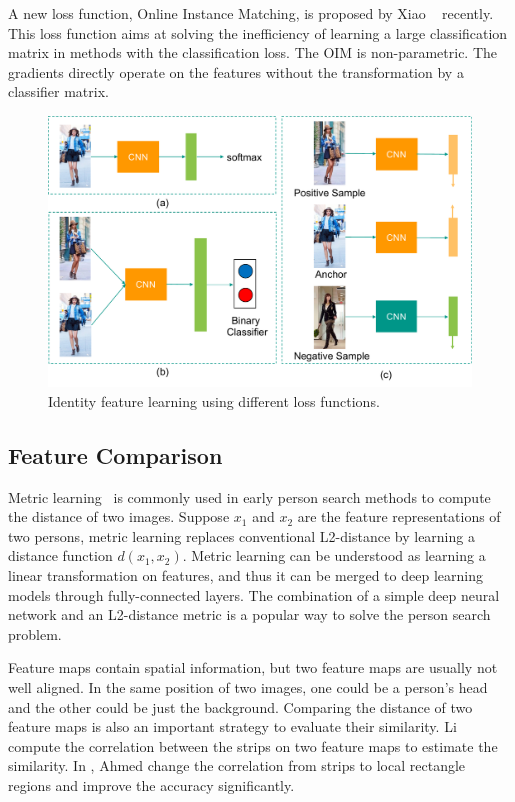 A new loss function, \eg Online Instance Matching, is proposed by Xiao \etal~\cite{xiao2017joint} recently. This loss function aims at solving the inefficiency of learning a large classification matrix in methods with the classification loss. The OIM is non-parametric. The gradients directly operate on the features without the transformation by a classifier matrix.

\begin{figure}[t]
\begin{center}
\includegraphics[width=1\linewidth]{figures/personsearch.pdf}
\caption{Identity feature learning using different loss functions.}
\label{fig:loss}
\end{center}
\end{figure}

\subsection{Feature Comparison}
Metric learning~\cite{davis2007information,weinberger2005distance,mcfee2010metric,koestinger2012large,liao2015person,zhang2016learning} is commonly used in early person search methods to compute the distance of two images. Suppose $x_1$ and $x_2$ are the feature representations of two persons, metric learning replaces conventional L2-distance by learning a distance function $d(x_1, x_2)$. Metric learning can be understood as learning a linear transformation on features, and thus it can be merged to deep learning models through fully-connected layers. The combination of a simple deep neural network and an L2-distance metric is a popular way to solve the person search problem.

Feature maps contain spatial information, but two feature maps are usually not well aligned. In the same position of two images, one could be a person's head and the other could be just the background. Comparing the distance of two feature maps is also an important strategy to evaluate their similarity. Li \etal~\cite{li2014deepreid} compute the correlation between the strips on two feature maps to estimate the similarity. In \cite{ahmed2015improved}, Ahmed \etal change the correlation from strips to local rectangle regions and improve the accuracy significantly. 

